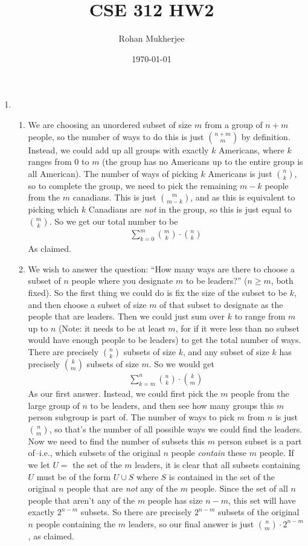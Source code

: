 \documentclass[12pt]{article}
\title{CSE 312 HW2}
\date{\today}
\author{Rohan Mukherjee}
\theoremstyle{definition}
\theoremstyle{remark}
\begin{document}
	\maketitle
	\begin{enumerate}[leftmargin=\labelsep]
		\item \begin{enumerate}
			\item We are choosing an unordered subset of size $m$ from a group of $n+m$ people, so the number of ways to do this is just ${n+m \choose m}$ by definition. Instead, we could add up all groups with exactly $k$ Americans, where $k$ ranges from $0$ to $m$ (the group has no Americans up to the entire group is all American). The number of ways of picking $k$ Americans is just $n \choose k$, so to complete the group, we need to pick the remaining $m-k$ people from the $m$ canadians. This is just ${m \choose m-k}$, and as this is equivalent to picking which $k$ Canadians are \textit{not} in the group, so this is just equal to ${m \choose k}$. So we get our total number to be
			\begin{align*}
				\sum_{k=0}^{m} {m \choose k} \cdot {n \choose k}
			\end{align*}
			As claimed.
			
			\item We wish to answer the question: ``How many ways are there to choose a subset of $n$ people where you designate $m$ to be leaders?'' ($n \geq m$, both fixed). So the first thing we could do is fix the size of the subset to be $k$, and then choose a subset of size $m$ of that subset to designate as the people that are leaders. Then we could just sum over $k$ to range from $m$ up to $n$ (Note: it needs to be at least $m$, for if it were less than no subset would have enough people to be leaders) to get the total number of ways. There are precisely $n \choose k$ subsets of size $k$, and any subset of size $k$ has precisely ${k \choose m}$ subsets of size $m$. So we would get
			\begin{align*}
				\sum_{k=m}^n {n \choose k} \cdot {k \choose m}
			\end{align*}
			As our first answer. Instead, we could first pick the $m$ people from the large group of $n$ to be leaders, and then see how many groups this $m$ person subgroup is part of. The number of ways to pick $m$ from $n$ is just ${n \choose m}$, so that's the number of all possible ways we could find the leaders. Now we need to find the number of subsets this $m$ person subset is a part of--i.e., which subsets of the original $n$ people \textit{contain} these $m$ people. If we let $U=$ the set of the $m$ leaders, it is clear that all subsets containing $U$ must be of the form $U \cup S$ where $S$ is contained in the set of the original $n$ people that are \textit{not} any of the $m$ people. Since the set of all $n$ people that aren't any of the $m$ people has size $n-m$, this set will have exactly $2^{n-m}$ subsets. So there are precisely $2^{n-m}$ subsets of the original $n$ people containing the $m$ leaders, so our final answer is just ${n \choose m} \cdot 2^{n-m}$, as claimed.
		\end{enumerate}
	

\end{enumerate}
\end{document}
